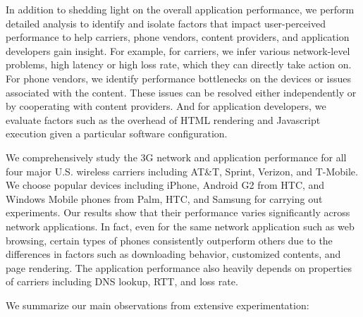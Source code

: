 In addition to shedding light on the overall application performance, we perform detailed analysis to identify and isolate
factors that impact user-perceived performance to help carriers,
phone vendors, content providers, and application developers gain 
insight. For example, for carriers, we infer various network-level 
problems, \eg high latency or high loss rate, which they can directly 
take action on. For phone vendors, we identify performance bottlenecks 
on the devices or issues associated with the content. These issues can
be resolved either independently or by cooperating with content 
providers. And for application developers, we evaluate factors such 
as the overhead of HTML rendering and Javascript execution given a 
particular software configuration.

We comprehensively study the 3G network and application performance
for all four major U.S. wireless carriers including AT\&T, Sprint,
Verizon, and T-Mobile. We choose popular devices including iPhone,
Android G2 from HTC, and Windows Mobile phones from Palm, HTC, and 
Samsung for carrying out experiments. Our results show that their
performance varies significantly across network applications. In 
fact, even for the same network application such as web browsing, 
certain types of phones consistently outperform others due to the 
differences in factors such as downloading behavior, customized 
contents, and page rendering. The application performance also 
heavily depends on properties of carriers including DNS lookup, 
RTT, and loss rate.

We summarize our main observations from extensive experimentation:

